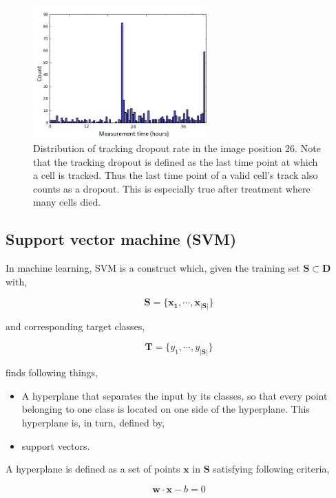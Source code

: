\documentclass[pdftex,12pt,a4paper]{report}
\begin{document}
\begin{figure}[H]
\centering
\includegraphics[width=0.6\textwidth]{images/dropout.png}
\caption[Tracking dropout rate]{Distribution of tracking dropout rate in the image position 26. Note that the tracking dropout is defined as the last time point at which a cell is tracked. Thus the last time point of a valid cell's track also counts as a dropout. This is especially true after treatment where many cells died.}
\label{fig:dropout_rate}
\end{figure}

\subsection{Support vector machine (SVM)}
\label{subsection:svm}

In machine learning, SVM is a construct which, given the training set $\mathbf{S} \subset \mathbf{D}$ with,

$$
\mathbf{S} = \{\mathbf{x_1}, \cdots, \mathbf{x}_{ \vert \mathbf{S} \vert }\}
$$

and corresponding target classes,

$$
\mathbf{T} = \{y_1, \cdots, y_{\vert \mathbf{S} \vert}\}
$$

finds following things,

\begin{itemize}
\item A hyperplane that separates the input by its classes, so that every point belonging to one class is located on one side of the hyperplane. This hyperplane is, in turn, defined by,
\item support vectors.
\end{itemize}

A hyperplane is defined as a set of points $\mathbf{x}$ in $\mathbf{S}$ satisfying following criteria,

\begin{equation}
\mathbf{w} \cdot \mathbf{x} - b = 0
\label{equation:hyperplane}
\end{equation}
\end{document}
